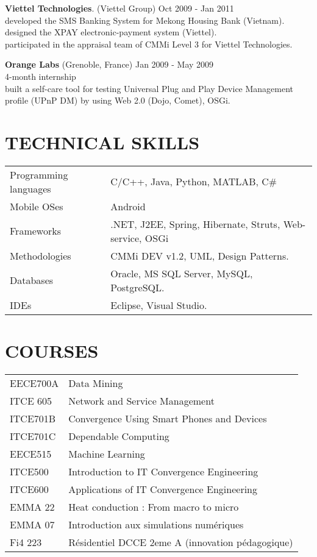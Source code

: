 \documentclass[margin, 10pt]{res} %
\begin{document}
\begin{resume}
\textbf{Viettel Technologies}. (Viettel Group)		\hfill Oct 2009 - Jan 2011 \\
developed the SMS Banking System for Mekong Housing Bank (Vietnam). \\
designed the XPAY electronic-payment system (Viettel). \\
participated in the appraisal team of CMMi Level 3 for Viettel Technologies.

\textbf{Orange Labs} (Grenoble, France)			\hfill Jan 2009 - May 2009 \\
4-month internship \\
built a self-care tool for testing Universal Plug and Play Device Management profile (UPnP DM) by using Web 2.0 (Dojo, Comet), OSGi. \\


\section{TECHNICAL SKILLS}

\begin{table}[h]
\begin{tabular}{ll}
Programming languages & C/C++, Java, Python, MATLAB, C\# \\
Mobile OSes &	Android \\
Frameworks & 	.NET, J2EE, Spring, Hibernate, Struts, Web-service, OSGi \\
Methodologies & CMMi DEV v1.2, UML, Design Patterns. \\
Databases &	Oracle, MS SQL Server, MySQL, PostgreSQL. \\
IDEs & 		Eclipse, Visual Studio. \\
\end{tabular}
\end{table}

\pagebreak
\section{COURSES}
\begin{table}[h]
\begin{tabular}{ll}
EECE700A & Data Mining \\ 
ITCE 605 & Network and Service Management \\
ITCE701B & Convergence Using Smart Phones and Devices \\
ITCE701C & Dependable Computing \\
EECE515  & Machine Learning \\
ITCE500	 & Introduction to IT Convergence Engineering \\
ITCE600  & Applications of IT Convergence Engineering \\
EMMA 22  & Heat conduction : From macro to micro \\
EMMA 07  & Introduction aux simulations numériques \\
Fi4 223  & Résidentiel DCCE 2eme A (innovation pédagogique) \\
\end{tabular}
\end{table}



\end{resume}
\end{document}
